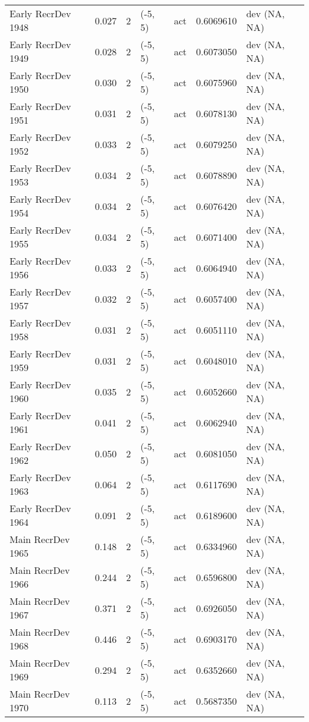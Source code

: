 \documentclass[11pt,
  english,
  letterpaper,
]{article}
\begin{document}
\begin{landscape}
\begin{longtable}[t]{>{\raggedright\arraybackslash}p{7cm}lllll>{\raggedright\arraybackslash}p{4cm}}
Early RecrDev 1948 & 0.027 & 2 & (-5, 5) & act & 0.6069610 & dev (NA, NA)\\
Early RecrDev 1949 & 0.028 & 2 & (-5, 5) & act & 0.6073050 & dev (NA, NA)\\
Early RecrDev 1950 & 0.030 & 2 & (-5, 5) & act & 0.6075960 & dev (NA, NA)\\
Early RecrDev 1951 & 0.031 & 2 & (-5, 5) & act & 0.6078130 & dev (NA, NA)\\
Early RecrDev 1952 & 0.033 & 2 & (-5, 5) & act & 0.6079250 & dev (NA, NA)\\
Early RecrDev 1953 & 0.034 & 2 & (-5, 5) & act & 0.6078890 & dev (NA, NA)\\
Early RecrDev 1954 & 0.034 & 2 & (-5, 5) & act & 0.6076420 & dev (NA, NA)\\
Early RecrDev 1955 & 0.034 & 2 & (-5, 5) & act & 0.6071400 & dev (NA, NA)\\
Early RecrDev 1956 & 0.033 & 2 & (-5, 5) & act & 0.6064940 & dev (NA, NA)\\
Early RecrDev 1957 & 0.032 & 2 & (-5, 5) & act & 0.6057400 & dev (NA, NA)\\
Early RecrDev 1958 & 0.031 & 2 & (-5, 5) & act & 0.6051110 & dev (NA, NA)\\
Early RecrDev 1959 & 0.031 & 2 & (-5, 5) & act & 0.6048010 & dev (NA, NA)\\
Early RecrDev 1960 & 0.035 & 2 & (-5, 5) & act & 0.6052660 & dev (NA, NA)\\
Early RecrDev 1961 & 0.041 & 2 & (-5, 5) & act & 0.6062940 & dev (NA, NA)\\
Early RecrDev 1962 & 0.050 & 2 & (-5, 5) & act & 0.6081050 & dev (NA, NA)\\
Early RecrDev 1963 & 0.064 & 2 & (-5, 5) & act & 0.6117690 & dev (NA, NA)\\
Early RecrDev 1964 & 0.091 & 2 & (-5, 5) & act & 0.6189600 & dev (NA, NA)\\
Main RecrDev 1965 & 0.148 & 2 & (-5, 5) & act & 0.6334960 & dev (NA, NA)\\
Main RecrDev 1966 & 0.244 & 2 & (-5, 5) & act & 0.6596800 & dev (NA, NA)\\
Main RecrDev 1967 & 0.371 & 2 & (-5, 5) & act & 0.6926050 & dev (NA, NA)\\
Main RecrDev 1968 & 0.446 & 2 & (-5, 5) & act & 0.6903170 & dev (NA, NA)\\
Main RecrDev 1969 & 0.294 & 2 & (-5, 5) & act & 0.6352660 & dev (NA, NA)\\
Main RecrDev 1970 & 0.113 & 2 & (-5, 5) & act & 0.5687350 & dev (NA, NA)\\

\end{longtable}
\end{landscape}
\end{document}
